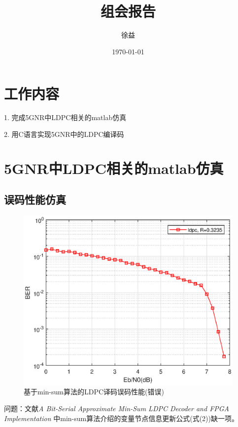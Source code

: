 \documentclass{article}
\title{组会报告}
\author{徐益}
\date{\today}
\begin{document}
\maketitle


\section{工作内容}

1. 完成5GNR中LDPC相关的matlab仿真

2. 用C语言实现5GNR中的LDPC编译码

\section{5GNR中LDPC相关的matlab仿真}

\subsection{误码性能仿真}
\begin{figure}[H]
	\centering
	\includegraphics[width = .8\textwidth]{error.eps}
	\caption{基于min-sum算法的LDPC译码误码性能(错误)}
\end{figure}
问题：文献\emph{A Bit-Serial Approximate Min-Sum LDPC Decoder and FPGA Implementation}
中min-sum算法介绍的变量节点信息更新公式(式(2))缺一项。
\end{document}
